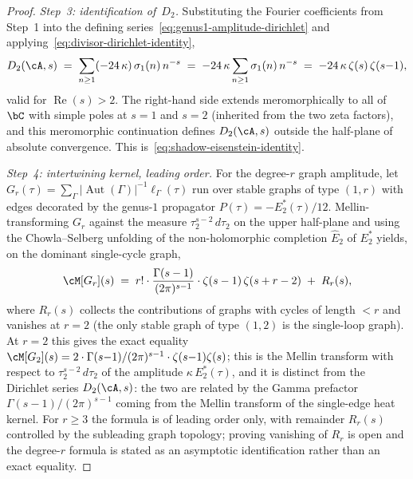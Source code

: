 \begin{proof}
\emph{Step~3: identification of~$D_2$.}
Substituting the Fourier coefficients from Step~1 into the
defining series~\eqref{eq:genus1-amplitude-dirichlet} and
applying~\eqref{eq:divisor-dirichlet-identity},
\[
 D_2(\cA, s)
 \;=\;
 \sum_{n \ge 1} (-24\,\kappa)\,\sigma_1(n)\,n^{-s}
 \;=\;
 -24\,\kappa
 \sum_{n \ge 1} \sigma_1(n)\,n^{-s}
 \;=\;
 -24\,\kappa\,\zeta(s)\,\zeta(s{-}1),
\]
valid for $\operatorname{Re}(s) > 2$. The right-hand side
extends meromorphically to all of~$\bC$ with simple poles at
$s = 1$ and $s = 2$ (inherited from the two zeta factors),
and this meromorphic continuation defines $D_2(\cA, s)$
outside the half-plane of absolute convergence.
This is~\eqref{eq:shadow-eisenstein-identity}.

\emph{Step~4: intertwining kernel, leading order.}
For the degree-$r$ graph amplitude, let
$G_r(\tau) = \sum_\Gamma |\!\operatorname{Aut}(\Gamma)|^{-1}
\ell_\Gamma(\tau)$ run over stable graphs of type
$(1, r)$ with edges decorated by the genus-$1$ propagator
$P(\tau) = -E_2^*(\tau)/12$. Mellin-transforming $G_r$
against the measure
$\tau_2^{s-2}\,d\tau_2$ on the upper half-plane and using
the Chowla--Selberg unfolding of the non-holomorphic
completion $\widehat{E}_2$ of $E_2^*$ yields, on the dominant single-cycle
graph,
\[
 \cM[G_r](s)
 \;=\;
 r! \cdot \frac{\Gamma(s-1)}{(2\pi)^{s-1}}
 \cdot \zeta(s-1)\,\zeta(s+r-2)
 \;+\; R_r(s),
\]
where $R_r(s)$ collects the contributions of graphs with
cycles of length $< r$ and vanishes at $r = 2$ (the only
stable graph of type $(1,2)$ is the single-loop graph).
At $r = 2$ this gives the exact equality
$\cM[G_2](s) = 2\cdot\Gamma(s{-}1)/(2\pi)^{s-1} \cdot
\zeta(s{-}1)\zeta(s)$; this is the Mellin transform with
respect to $\tau_2^{s-2}\,d\tau_2$ of the amplitude
$\kappa\,E_2^*(\tau)$, and it is distinct from the Dirichlet
series $D_2(\cA, s)$: the two are related by the Gamma
prefactor $\Gamma(s{-}1)/(2\pi)^{s-1}$ coming from the
Mellin transform of the single-edge heat kernel. For
$r \ge 3$ the formula is of leading order only, with
remainder $R_r(s)$ controlled by the subleading graph
topology; proving vanishing of $R_r$ is open and the
degree-$r$ formula is stated as an asymptotic
identification rather than an exact equality.
\end{proof}

